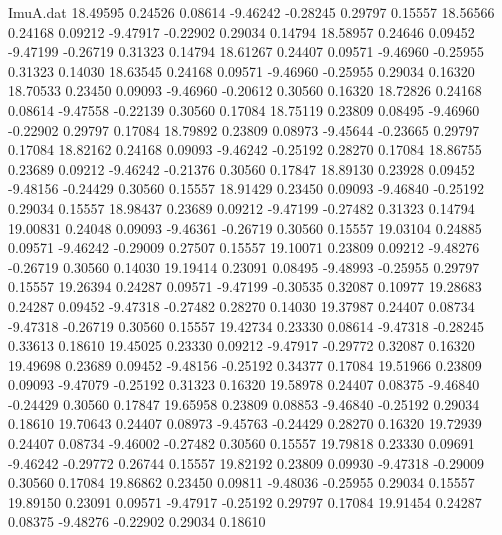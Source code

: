 \begin{filecontents}{ImuA.dat}
  18.49595    0.24526    0.08614   -9.46242   -0.28245    0.29797    0.15557
  18.56566    0.24168    0.09212   -9.47917   -0.22902    0.29034    0.14794
  18.58957    0.24646    0.09452   -9.47199   -0.26719    0.31323    0.14794
  18.61267    0.24407    0.09571   -9.46960   -0.25955    0.31323    0.14030
  18.63545    0.24168    0.09571   -9.46960   -0.25955    0.29034    0.16320
  18.70533    0.23450    0.09093   -9.46960   -0.20612    0.30560    0.16320
  18.72826    0.24168    0.08614   -9.47558   -0.22139    0.30560    0.17084
  18.75119    0.23809    0.08495   -9.46960   -0.22902    0.29797    0.17084
  18.79892    0.23809    0.08973   -9.45644   -0.23665    0.29797    0.17084
  18.82162    0.24168    0.09093   -9.46242   -0.25192    0.28270    0.17084
  18.86755    0.23689    0.09212   -9.46242   -0.21376    0.30560    0.17847
  18.89130    0.23928    0.09452   -9.48156   -0.24429    0.30560    0.15557
  18.91429    0.23450    0.09093   -9.46840   -0.25192    0.29034    0.15557
  18.98437    0.23689    0.09212   -9.47199   -0.27482    0.31323    0.14794
  19.00831    0.24048    0.09093   -9.46361   -0.26719    0.30560    0.15557
  19.03104    0.24885    0.09571   -9.46242   -0.29009    0.27507    0.15557
  19.10071    0.23809    0.09212   -9.48276   -0.26719    0.30560    0.14030
  19.19414    0.23091    0.08495   -9.48993   -0.25955    0.29797    0.15557
  19.26394    0.24287    0.09571   -9.47199   -0.30535    0.32087    0.10977
  19.28683    0.24287    0.09452   -9.47318   -0.27482    0.28270    0.14030
  19.37987    0.24407    0.08734   -9.47318   -0.26719    0.30560    0.15557
  19.42734    0.23330    0.08614   -9.47318   -0.28245    0.33613    0.18610
  19.45025    0.23330    0.09212   -9.47917   -0.29772    0.32087    0.16320
  19.49698    0.23689    0.09452   -9.48156   -0.25192    0.34377    0.17084
  19.51966    0.23809    0.09093   -9.47079   -0.25192    0.31323    0.16320
  19.58978    0.24407    0.08375   -9.46840   -0.24429    0.30560    0.17847
  19.65958    0.23809    0.08853   -9.46840   -0.25192    0.29034    0.18610
  19.70643    0.24407    0.08973   -9.45763   -0.24429    0.28270    0.16320
  19.72939    0.24407    0.08734   -9.46002   -0.27482    0.30560    0.15557
  19.79818    0.23330    0.09691   -9.46242   -0.29772    0.26744    0.15557
  19.82192    0.23809    0.09930   -9.47318   -0.29009    0.30560    0.17084
  19.86862    0.23450    0.09811   -9.48036   -0.25955    0.29034    0.15557
  19.89150    0.23091    0.09571   -9.47917   -0.25192    0.29797    0.17084
  19.91454    0.24287    0.08375   -9.48276   -0.22902    0.29034    0.18610

\end{filecontents}
